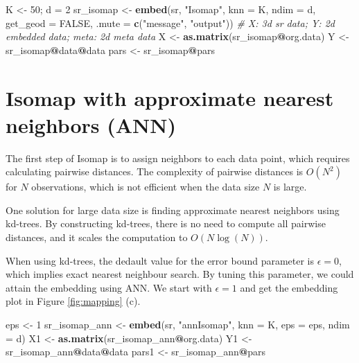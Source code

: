 \documentclass[11pt,a4paper,]{article}
\newenvironment{Shaded}{\begin{snugshade}}{\end{snugshade}}
\newcommand{\CommentTok}[1]{\textcolor[rgb]{0.56,0.35,0.01}{\textit{#1}}}
\newcommand{\DataTypeTok}[1]{\textcolor[rgb]{0.13,0.29,0.53}{#1}}
\newcommand{\DecValTok}[1]{\textcolor[rgb]{0.00,0.00,0.81}{#1}}
\newcommand{\KeywordTok}[1]{\textcolor[rgb]{0.13,0.29,0.53}{\textbf{#1}}}
\newcommand{\NormalTok}[1]{#1}
\newcommand{\OperatorTok}[1]{\textcolor[rgb]{0.81,0.36,0.00}{\textbf{#1}}}
\newcommand{\OtherTok}[1]{\textcolor[rgb]{0.56,0.35,0.01}{#1}}
\newcommand{\StringTok}[1]{\textcolor[rgb]{0.31,0.60,0.02}{#1}}
\begin{document}
\begin{Shaded}
\begin{Highlighting}[]
\NormalTok{K \textless{}{-}}\StringTok{ }\DecValTok{50}\NormalTok{; d =}\StringTok{ }\DecValTok{2}
\NormalTok{sr\_isomap \textless{}{-}}\StringTok{ }\KeywordTok{embed}\NormalTok{(sr, }\StringTok{"Isomap"}\NormalTok{, }\DataTypeTok{knn =}\NormalTok{ K, }\DataTypeTok{ndim =}\NormalTok{ d, }\DataTypeTok{get\_geod =} \OtherTok{FALSE}\NormalTok{, }
                   \DataTypeTok{.mute =} \KeywordTok{c}\NormalTok{(}\StringTok{"message"}\NormalTok{, }\StringTok{"output"}\NormalTok{))}
\CommentTok{\# X: 3d sr data; Y: 2d embedded data; meta: 2d meta data}
\NormalTok{X \textless{}{-}}\StringTok{ }\KeywordTok{as.matrix}\NormalTok{(sr\_isomap}\OperatorTok{@}\NormalTok{org.data)}
\NormalTok{Y \textless{}{-}}\StringTok{ }\NormalTok{sr\_isomap}\OperatorTok{@}\NormalTok{data}\OperatorTok{@}\NormalTok{data}
\NormalTok{pars \textless{}{-}}\StringTok{ }\NormalTok{sr\_isomap}\OperatorTok{@}\NormalTok{pars}
\end{Highlighting}
\end{Shaded}

\hypertarget{isomap-with-approximate-nearest-neighbors-ann}{%
\section{Isomap with approximate nearest neighbors (ANN)}\label{isomap-with-approximate-nearest-neighbors-ann}}

The first step of Isomap is to assign neighbors to each data point, which requires calculating pairwise distances. The complexity of pairwise distances is \(O(N^2)\) for \(N\) observations, which is not efficient when the data size \(N\) is large.

One solution for large data size is finding approximate nearest neighbors using kd-trees. By constructing kd-trees, there is no need to compute all pairwise distances, and it scales the computation to \(O(N\log(N))\).

When using kd-trees, the dedault value for the error bound parameter is \(\epsilon=0\), which implies exact nearest neighbour search. By tuning this parameter, we could attain the embedding using ANN. We start with \(\epsilon=1\) and get the embedding plot in Figure \ref{fig:mapping} (c).

\begin{Shaded}
\begin{Highlighting}[]
\NormalTok{eps \textless{}{-}}\StringTok{ }\DecValTok{1}
\NormalTok{sr\_isomap\_ann \textless{}{-}}\StringTok{ }\KeywordTok{embed}\NormalTok{(sr, }\StringTok{"annIsomap"}\NormalTok{, }\DataTypeTok{knn =}\NormalTok{ K, }\DataTypeTok{eps =}\NormalTok{ eps, }\DataTypeTok{ndim =}\NormalTok{ d)}
\NormalTok{X1 \textless{}{-}}\StringTok{ }\KeywordTok{as.matrix}\NormalTok{(sr\_isomap\_ann}\OperatorTok{@}\NormalTok{org.data)}
\NormalTok{Y1 \textless{}{-}}\StringTok{ }\NormalTok{sr\_isomap\_ann}\OperatorTok{@}\NormalTok{data}\OperatorTok{@}\NormalTok{data}
\NormalTok{pars1 \textless{}{-}}\StringTok{ }\NormalTok{sr\_isomap\_ann}\OperatorTok{@}\NormalTok{pars}
\end{Highlighting}
\end{Shaded}
\end{document}

